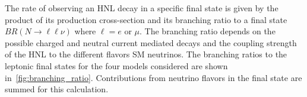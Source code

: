 The rate of observing an HNL decay in a specific final state is given by the product of its production cross-section and its branching ratio to a final state $BR(N\to \ell \ell \nu)$ where $\ell=e\text{ or }\mu$. The branching ratio depends on the possible charged and neutral current mediated decays and the coupling strength of the HNL to the different flavors SM neutrinos. The branching ratios to the leptonic final states for the four models considered are shown in~\cref{fig:branching_ratio}. Contributions from neutrino flavors in the final state are summed for this calculation.

\begin{figure}[!ht]
    \centering
    \\

\end{figure}
